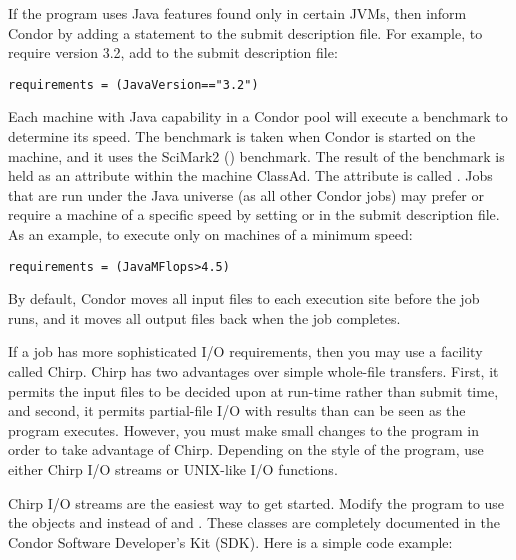 If the program uses Java features found only in certain
JVMs, then inform Condor by adding a 
statement to the submit description file.
For example, to require version 3.2, add to the submit description
file:

\begin{verbatim}
requirements = (JavaVersion=="3.2")
\end{verbatim}

Each machine with Java capability in a Condor pool
will execute a benchmark to determine its speed.
The benchmark is taken when Condor is started on
the machine, and it uses the SciMark2
() benchmark.
The result of the benchmark is held as an attribute
within the 
machine ClassAd.
The attribute is called .
Jobs that are run under the Java universe (as all other Condor jobs)
may prefer or require a machine of a specific speed
by setting  or  in
the submit description file.
As an example, to execute only on machines of a minimum speed:

\begin{verbatim}
requirements = (JavaMFlops>4.5)
\end{verbatim}

By default, Condor moves all input files
to each execution site before the job runs, and it moves
all output files back when the job completes.

If a job has more sophisticated I/O requirements, then
you may use a facility called Chirp.
Chirp has two advantages over simple whole-file transfers.
First, it permits the input files to be decided upon at run-time
rather than submit time, and second,
it permits partial-file I/O with results than can be seen as the
program executes.
However, you must make small changes to the program
in order to take advantage of Chirp.
Depending on the style of the program, use either Chirp I/O streams
or UNIX-like I/O functions.

Chirp I/O streams are the easiest way to get started.
Modify the program to use the objects 
and  instead of  and
.
These classes are completely documented
in the Condor Software Developer's Kit (SDK).
Here is a simple code example:

